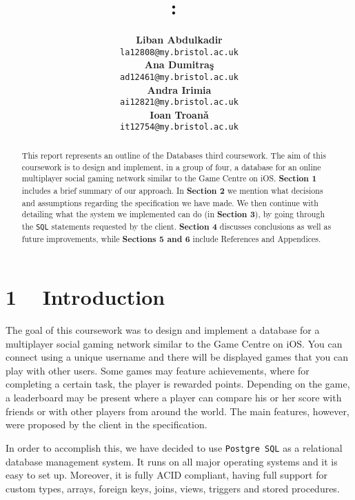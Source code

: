 \documentclass{article}
\title{
\vspace{0.2in}
\textmd{\textbf{\hmwkClass:\ \hmwkTitle}}\\
\vspace{0.5in}
\textmd{\hmwkDueDate}
\vspace{1.5in}
}
\author{
  \textbf{Liban Abdulkadir}\\
  \texttt{la12808@my.bristol.ac.uk}\\
  \textbf{Ana Dumitra\c{s}}\\
  \texttt{ad12461@my.bristol.ac.uk}\\
  \textbf{Andra Irimia}\\
  \texttt{ai12821@my.bristol.ac.uk}\\
  \textbf{Ioan Troan\v{a}}\\
  \texttt{it12754@my.bristol.ac.uk}\\
\vspace{1in}
}
\date{}
\begin{document}
\maketitle





\begin{abstract}
This report represents an outline of the Databases third coursework. The aim of this coursework is to design and implement, in a group of four, a database for an online multiplayer social gaming network similar to the Game Centre on iOS. \textbf{Section 1} includes a brief summary of our approach. In \textbf{Section 2} we mention what decisions and assumptions regarding the specification we have made. We then continue with detailing what the system we implemented can do (in \textbf{Section 3}), by going through the \texttt{SQL} statements requested by the client. \textbf{Section 4} discusses conclusions as well as future improvements, while \textbf{Sections 5 and 6} include References and Appendices.

\end{abstract}


\section{1  ~ Introduction}
\par {The goal of this coursework was to design and implement a database for a multiplayer social gaming network similar to the Game Centre on iOS. You can connect using a unique username and there will be displayed games that you can play with other users. Some games may feature achievements, where for completing a certain task, the player is rewarded points. Depending on the game, a leaderboard may be present where a player can compare his or her score with friends or with other players from around the world. The main features, however, were proposed by the client in the specification.} \\
\par {In order to accomplish this, we have decided to use \texttt {Postgre SQL} as a relational database management system. It runs on all major operating systems and it is easy to set up. Moreover, it is fully ACID compliant, having full support for custom types, arrays, foreign keys, joins, views, triggers and stored procedures. \cite{link1}}
\end{document}
